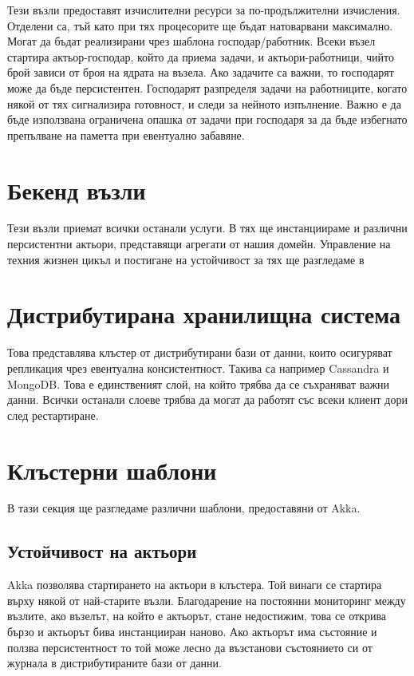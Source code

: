 Тези възли предоставят изчислителни ресурси за по-продължителни изчисления. Отделени са, тъй като при тях процесорите ще бъдат натоварвани максимално. Могат да бъдат реализирани чрез шаблона господар/работник. Всеки възел стартира актьор-господар, който да приема задачи, и актьори-работници, чийто брой зависи от броя на ядрата на възела. Ако задачите са важни, то господарят може да бъде персистентен. Господарят разпределя задачи на работниците, когато някой от тях сигнализира готовност, и следи за нейното изпълнение. Важно е да бъде използвана ограничена опашка от задачи при господаря за да бъде избегнато препълване на паметта при евентуално забавяне.

\section{Бекенд възли}

Тези възли приемат всички останали услуги. В тях ще инстанциираме и различни персистентни актьори, представящи агрегати от нашия домейн. Управление на техния жизнен цикъл и постигане на устойчивост за тях ще разгледаме в 

\section{Дистрибутирана хранилищна система}

Това представлява клъстер от дистрибутирани бази от данни, които осигуряват репликация чрез евентуална консистентност. Такива са например Cassandra и MongoDB. Това е единственият слой, на който трябва да се съхраняват важни данни. Всички останали слоеве трябва да могат да работят със всеки клиент дори след рестартиране.

\section{Клъстерни шаблони}

В тази секция ще разгледаме различни шаблони, предоставяни от Akka.

\subsection{Устойчивост на  актьори}
\label{sec:singleton-actors-elasticity}

Akka позволява стартирането на  актьори в клъстера. Той винаги се стартира върху някой от най-старите възли. Благодарение на постоянни мониторинг между възлите, ако възелът, на който е актьорът, стане недостижим, това се открива бързо и актьорът бива инстанцииран наново. Ако актьорът има състояние и ползва персистентност то той може лесно да възстанови състоянието си от журнала в дистрибутираните бази от данни.


